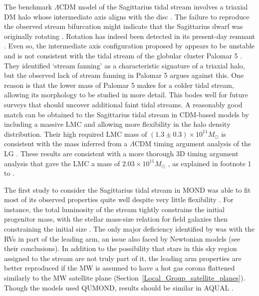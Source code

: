 \documentclass[fleqn,usenatbib,useAMS,onecolumn]{mnras} %
\begin{document}
The benchmark $\Lambda$CDM model of the Sagittarius tidal stream involves a triaxial DM halo whose intermediate axis aligns with the disc \citep{Law_2010}. The failure to reproduce the observed stream bifurcation might indicate that the Sagittarius dwarf was originally rotating \citep{Penarrubia_2010}. Rotation has indeed been detected in its present-day remnant \citep{Del_Pino_2021}. Even so, the intermediate axis configuration proposed by \citet{Law_2010} appears to be unstable \citep{Debbatista_2013} and is not consistent with the tidal stream of the globular cluster Palomar 5 \citep{Pearson_2015}. They identified `stream fanning' as a characteristic signature of a triaxial halo, but the observed lack of stream fanning in Palomar 5 argues against this. One reason is that the lower mass of Palomar 5 makes for a colder tidal stream, allowing its morphology to be studied in more detail. This bodes well for future surveys that should uncover additional faint tidal streams. A reasonably good match can be obtained to the Sagittarius tidal stream in CDM-based models by including a massive LMC \citep{Vasiliev_2021} and allowing more flexibility in the halo density distribution. Their high required LMC mass of $\left( 1.3 \pm 0.3 \right) \times 10^{11} M_\odot$ is consistent with the mass inferred from a $\Lambda$CDM timing argument analysis of the LG \citep{Jorge_2014, Jorge_2016, Banik_Zhao_2017}. These results are consistent with a more thorough 3D timing argument analysis that gave the LMC a mass of $2.03 \times 10^{11} M_\odot$ \citep{Banik_2018_anisotropy}, as explained in footnote 1 to \citet{Banik_2021_backsplash}.

The first study to consider the Sagittarius tidal stream in MOND was able to fit most of its observed properties quite well despite very little flexibility \citep{Thomas_2017}. For instance, the total luminosity of the stream tightly constrains the initial progenitor mass, with the stellar mass-size relation for field galaxies then constraining the initial size \citep{Dabringhausen_2013}. The only major deficiency identified by \citet{Thomas_2017} was with the RVs in part of the leading arm, an issue also faced by Newtonian models (see their conclusions). In addition to the possibility that stars in this sky region assigned to the stream are not truly part of it, the leading arm properties are better reproduced if the MW is assumed to have a hot gas corona flattened similarly to the MW satellite plane (Section~\ref{Local_Group_satellite_planes}). Though the models used QUMOND, results should be similar in AQUAL \citep{Banik_2018_EFE}.
\end{document}
